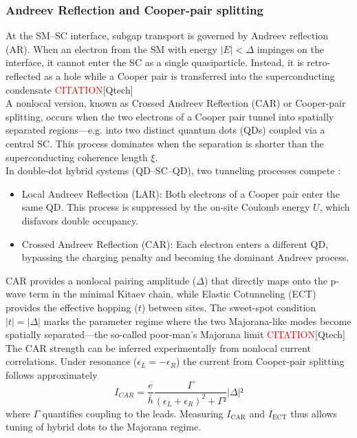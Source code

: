 \documentclass[11pt, letterpaper, titlepage]{article}
\begin{document}
\subsubsection{Andreev Reflection and Cooper-pair splitting}
At the SM–SC interface, subgap transport is governed by Andreev reflection (AR). When an electron from the SM with energy $|E|<\Delta$ impinges on the interface, it cannot enter the SC as a single quasiparticle. Instead, it is retro-reflected as a hole while a Cooper pair is transferred into the superconducting condensate \textcolor{red}{CITATION}[Qtech]\\
A nonlocal version, known as Crossed Andreev Reflection (CAR) or Cooper-pair splitting, occurs when the two electrons of a Cooper pair tunnel into spatially separated regions—e.g. into two distinct quantum dots (QDs) coupled via a central SC. This process dominates when the separation is shorter than the superconducting coherence length $\xi$.\\
In double-dot hybrid systems (QD–SC–QD), two tunneling processes compete \cite{qtech_boka}:
\begin{itemize}
  \item Local Andreev Reflection (LAR): Both electrons of a Cooper pair enter the same QD. This process is suppressed by the on-site Coulomb energy $U$, which disfavors double occupancy.
  \item Crossed Andreev Reflection (CAR): Each electron enters a different QD, bypassing the charging penalty and becoming the dominant Andreev process.
\end{itemize}
CAR provides a nonlocal pairing amplitude ($\Delta$) that directly maps onto the p-wave term in the minimal Kitaev chain, while Elastic Cotunneling (ECT) provides the effective hopping ($t$) between sites. The sweet-spot condition $|t|=|\Delta|$ marks the parameter regime where the two Majorana-like modes become spatially separated—the so-called poor-man’s Majorana limit \textcolor{red}{CITATION}[Qtech]\\
The CAR strength can be inferred experimentally from nonlocal current correlations. Under resonance ($\epsilon_L=-\epsilon_R$) the current from Cooper-pair splitting follows approximately
$$ I_{CAR} = \frac{e}{\bar{h}} \frac{Γ}{(ϵ_L + ϵ_R)^2 + Γ²} |Δ|²$$
where $\Gamma$ quantifies coupling to the leads. Measuring $I_{\mathrm{CAR}}$ and $I_{\mathrm{ECT}}$ thus allows tuning of hybrid dots to the Majorana regime.
\end{document}
